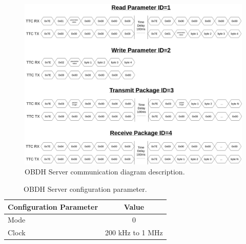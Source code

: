 \begin{figure}[!ht]
    \begin{center}
        \includegraphics[width=1\textwidth]{figures/obdh_communication.drawio.png}
        \caption{OBDH Server communication diagram description.}
        \label{fig:obdh-server-communication}
    \end{center}
\end{figure}

\begin{table}[!ht]
    \centering
    \begin{tabular}{lc}
        \toprule[1.5pt]
        \textbf{Configuration Parameter} & \textbf{Value}\\
        \midrule
        Mode  & 0                \\
        Clock & 200 kHz to 1 MHz \\
        \bottomrule[1.5pt]
    \end{tabular}
    \caption{OBDH Server configuration parameter.}
    \label{tab:eps_config}
\end{table}

